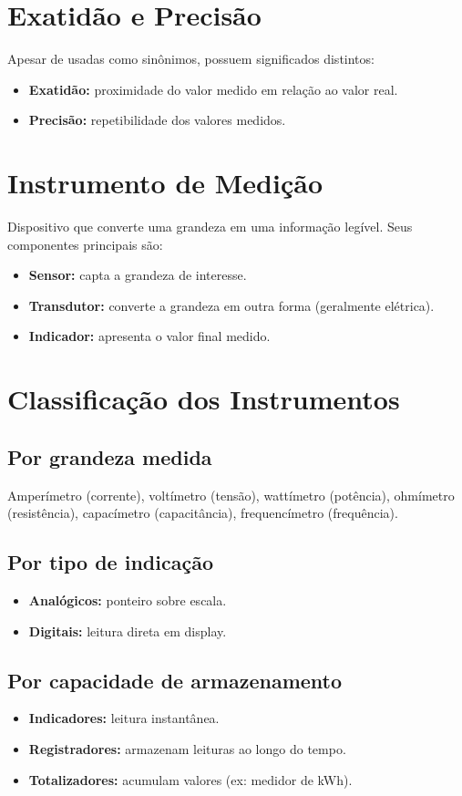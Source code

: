 \section{Exatidão e Precisão}
Apesar de usadas como sinônimos, possuem significados distintos:
\begin{itemize}
  \item \textbf{Exatidão:} proximidade do valor medido em relação ao valor real.
  \item \textbf{Precisão:} repetibilidade dos valores medidos.
\end{itemize}

\section{Instrumento de Medição}
Dispositivo que converte uma grandeza em uma informação legível. Seus componentes principais são:
\begin{itemize}
  \item \textbf{Sensor:} capta a grandeza de interesse.
  \item \textbf{Transdutor:} converte a grandeza em outra forma (geralmente elétrica).
  \item \textbf{Indicador:} apresenta o valor final medido.
\end{itemize}

\section{Classificação dos Instrumentos}
\subsection{Por grandeza medida}
Amperímetro (corrente), voltímetro (tensão), wattímetro (potência), ohmímetro (resistência), capacímetro (capacitância), frequencímetro (frequência).

\subsection{Por tipo de indicação}
\begin{itemize}
  \item \textbf{Analógicos:} ponteiro sobre escala.
  \item \textbf{Digitais:} leitura direta em display.
\end{itemize}

\subsection{Por capacidade de armazenamento}
\begin{itemize}
  \item \textbf{Indicadores:} leitura instantânea.
  \item \textbf{Registradores:} armazenam leituras ao longo do tempo.
  \item \textbf{Totalizadores:} acumulam valores (ex: medidor de kWh).
\end{itemize}

